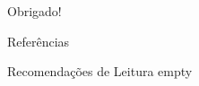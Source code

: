 \documentclass[aspectratio=43,10pt]{beamer}
\begin{document}
{\begin{frame}[standout]
  Obrigado!
\end{frame}}

\begin{frame}[allowframebreaks]{Referências}
  
\end{frame}

\appendix

\begin{frame}[fragile]{Recomendações de Leitura}
empty
\end{frame}
\end{document}
